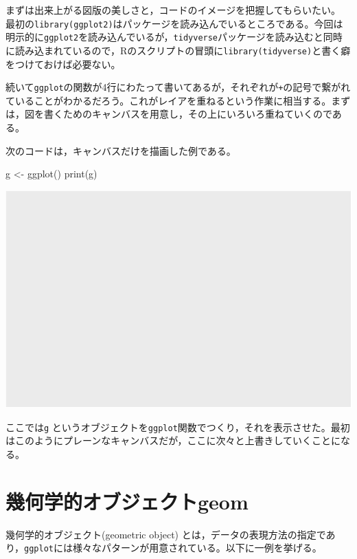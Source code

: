\documentclass[
  a4paper,
]{ltjsbook}
\newenvironment{Shaded}{\begin{snugshade}}{\end{snugshade}}
\newcommand{\FunctionTok}[1]{\textcolor[rgb]{0.28,0.35,0.67}{#1}}
\newcommand{\NormalTok}[1]{\textcolor[rgb]{0.00,0.23,0.31}{#1}}
\newcommand{\OtherTok}[1]{\textcolor[rgb]{0.00,0.23,0.31}{#1}}
\begin{document}
まずは出来上がる図版の美しさと，コードのイメージを把握してもらいたい。
最初の\texttt{library(ggplot2)}はパッケージを読み込んでいるところである。今回は明示的に\texttt{ggplot2}を読み込んでいるが，\texttt{tidyverse}パッケージを読み込むと同時に読み込まれているので，Rのスクリプトの冒頭に\texttt{library(tidyverse)}と書く癖をつけておけば必要ない。

続いて\texttt{ggplot}の関数が4行にわたって書いてあるが，それぞれが\texttt{+}の記号で繋がれていることがわかるだろう。これがレイアを重ねるという作業に相当する。まずは，図を書くためのキャンバスを用意し，その上にいろいろ重ねていくのである。

次のコードは，キャンバスだけを描画した例である。

\begin{Shaded}
\begin{Highlighting}[]
\NormalTok{g }\OtherTok{\textless{}{-}} \FunctionTok{ggplot}\NormalTok{()}
\FunctionTok{print}\NormalTok{(g)}
\end{Highlighting}
\end{Shaded}

\includegraphics{chapter04_files/figure-pdf/canvasOnly-1.pdf}

ここでは\texttt{g}
というオブジェクトを\texttt{ggplot}関数でつくり，それを表示させた。最初はこのようにプレーンなキャンバスだが，ここに次々と上書きしていくことになる。

\section{幾何学的オブジェクトgeom}\label{ux5e7eux4f55ux5b66ux7684ux30aaux30d6ux30b8ux30a7ux30afux30c8geom}

幾何学的オブジェクト(geometric object)
とは，データの表現方法の指定であり，\texttt{ggplot}には様々なパターンが用意されている。以下に一例を挙げる。
\end{document}
